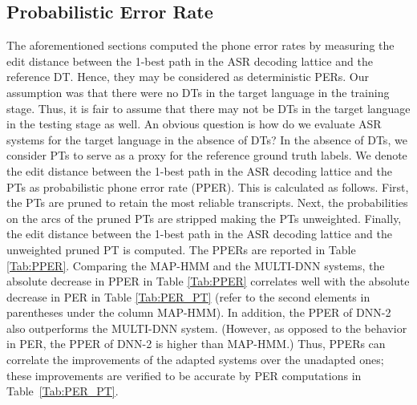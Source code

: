 \documentclass[a4paper]{article}
\begin{document}
\vspace{-1mm}
\subsection{Probabilistic Error Rate} \vspace{-1mm}
\label{sec:Probabilistic Error Rate}
The aforementioned sections computed the phone error rates by measuring the edit distance between the 1-best path in the ASR decoding lattice and the reference DT. Hence, they may be considered as deterministic PERs. Our assumption was that there were no DTs in the target language in the training stage. Thus, it is fair to assume that there may not be DTs in the target language in the testing stage as well. An obvious question is how do we evaluate ASR systems for the target language in the absence of DTs? In the absence of DTs, we consider PTs to serve as a proxy for the reference ground truth labels. We denote the edit distance between the 1-best path in the ASR decoding lattice and the PTs as probabilistic phone error rate (PPER).
This is calculated as follows. First, the PTs are pruned to retain the most reliable transcripts. Next, the probabilities on the arcs of the pruned PTs are stripped making the PTs unweighted. Finally, the edit distance between the 1-best path in the ASR decoding lattice and the unweighted pruned PT is computed. The PPERs are reported in Table \ref{Tab:PPER}. Comparing the MAP-HMM and the MULTI-DNN systems, the absolute decrease in PPER in Table \ref{Tab:PPER} correlates well with the absolute decrease in PER in Table \ref{Tab:PER_PT} (refer to the second elements in parentheses under the column MAP-HMM). In addition, the PPER of DNN-2 also outperforms the MULTI-DNN system. (However, as opposed to the behavior in PER, the PPER of DNN-2 is higher than MAP-HMM.) Thus, PPERs can correlate the improvements of the adapted systems over the unadapted ones; these improvements are verified to be accurate by PER computations in Table~\ref{Tab:PER_PT}.

\end{document}
